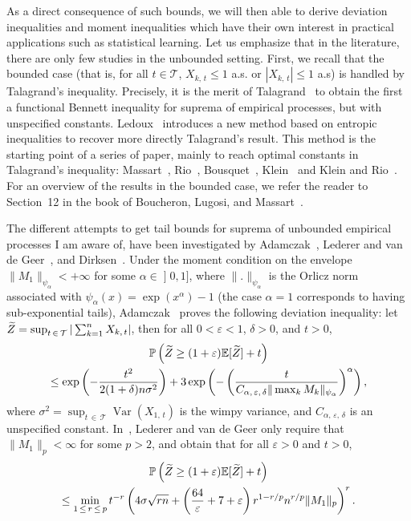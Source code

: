 \documentclass[AHL,Unicode,longabstracts,published]{cedram}
\DeclareMathOperator{\Var}{Var}
\newcommand{\bE}{\mathbb{E}}
\newcommand{\bP}{\mathbb{P}}
\newcommand{\cT}{\mathcal{T}}
\newcommand{\intervalleof}[2]{\mathopen{]} #1\mathclose{}\mathpunct{},#2\mathclose{]}}
\let\oldtilde\tilde
\renewcommand*{\tilde}[1]{\mathchoice{\widetilde{#1}}{\widetilde{#1}}{\oldtilde{#1}}{\oldtilde{#1}}}
\begin{document}
As a direct consequence of such bounds, we will then able to derive deviation inequalities and moment inequalities which have their own interest in practical applications such as statistical learning. Let us emphasize that in the literature, there are only few studies in the unbounded setting. First, we recall that the bounded case (that is, for all $t\in\cT$, $X_{k,\,t}\leq 1$ a.s. or $|X_{k,\,t}|\leq 1$ a.s) is handled by Talagrand's inequality. Precisely, it is the merit of Talagrand~\cite{Talagrand96a} to obtain the first a functional Bennett inequality for suprema of empirical processes, but with unspecified constants. Ledoux~\cite{Ledoux97} introduces a new method based on entropic inequalities to recover more directly Talagrand’s result. This method is the starting point of a series of paper, mainly to reach optimal constants in Talagrand's inequality: Massart~\cite{Massart00}, Rio~\cite{Rio01,Rio02,Rio12}, Bousquet~\cite{Bousquet03}, Klein~\cite{Klein02} and Klein and Rio~\cite{KR05}. For an overview of the results in the bounded case, we refer the reader to Section~12 in the book of Boucheron, Lugosi, and Massart~\cite{BLM13}.

The different attempts to get tail bounds for suprema of unbounded empirical processes I am aware of, have been investigated by Adamczak~\cite{Adamczak08}, Lederer and van de Geer~\cite{vdGL14,vdGL13}, and Dirksen~\cite{Dirksen15}. Under the moment condition on the envelope $\|M_1\|_{\psi_\alpha}<+\infty$ for some $\alpha\in\intervalleof 01$, where $\|.\|_{\psi_\alpha}$ is the Orlicz norm associated with $\psi_\alpha(x)=\exp(x^{\alpha})-1$ (the case $\alpha=1$ corresponds to having sub-exponential tails), Adamczak~\cite[Theorem~4]{Adamczak08} proves the following deviation inequality: let $\tilde Z=\sup_{t\,\in\,\cT}|\sum_{k=1}^nX_{k,\,t}|$, then for all $0<\varepsilon<1$, $\delta>0$, and $t>0$,
\begin{multline}
\bP\left(\tilde Z\geq (1+\varepsilon)\bE[\tilde Z]+t\right)\\
\leq \exp\left(-\frac{t^2}{2(1+\delta)n\sigma^2}\right)+3\exp\left(-\left(\frac{t}{C_{\alpha,\,\varepsilon,\,\delta}\|\max_k M_k\|_{\psi_\alpha}}\right)^\alpha\right),
\end{multline}
where $\sigma^2=\sup_{t\,\in\,\cT}\Var(X_{1,\,t})$ is the wimpy variance, and $C_{\alpha,\,\varepsilon,\,\delta}$ is an unspecified constant. In~\cite[Corollary~3.1]{vdGL14}, Lederer and van de Geer only require that $\|M_1\|_p<\infty$ for some $p>2$, and obtain that for all $\varepsilon>0$ and $t>0$,
\begin{multline}
\bP\left(\tilde Z\geq (1+\varepsilon)\bE[\tilde Z]+ t\right) \\
\leq \min_{1\,\leq\,r\,\leq\,p} t^{-r}\left(4\sigma\sqrt{rn}+\left(\frac{64}{\varepsilon}+7+\varepsilon\right)r^{1-r/p}n^{r/p}\|M_1\|_p\right)^r.
\end{multline}
\end{document}
